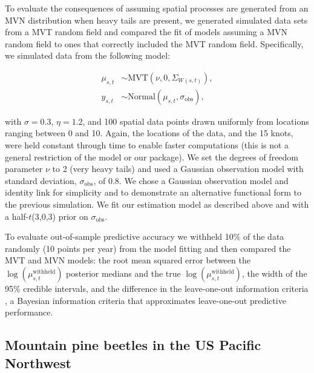 \documentclass[12pt,english]{article}
\begin{document}
\begin{spacing}{1.9}
To evaluate the consequences of assuming spatial processes are generated from an MVN
distribution when heavy tails are present, we generated simulated
data sets from a MVT random field and compared the fit of models assuming a
MVN random field to ones that correctly included the MVT random field. Specifically, we
simulated data from the following model:

\begin{align}
  \mu_{s,t} &\sim \mathrm{MVT}\left(\nu, 0, \Sigma_{W(s,t)}\right),\\
  y_{s,t} &\sim \mathrm{Normal} \left(\mu_{s,t}, \sigma_{\mathrm{obs}} \right),
\end{align}

\noindent with $\sigma = 0.3$, $\eta = 1.2$, and 100 spatial data points drawn uniformly
from locations ranging between 0 and 10. Again, the locations
of the data, and the 15 knots, were held constant through time to enable faster
computations (this is not a general restriction of the model or our package).
We set the degrees of freedom parameter $\nu$ to 2 (very heavy tails) and used a
Gaussian observation model with standard deviation, $\sigma_{\mathrm{obs}}$, of
0.8. We chose a Gaussian observation
model and identity link for simplicity and to demonstrate an alternative
functional form to the previous simulation. We fit our estimation model as
described above and with a half-$t$(3,0,3) prior on $\sigma_{\mathrm{obs}}$.

To evaluate out-of-sample predictive accuracy we withheld
10\% of the data randomly (10 points per year)
from the model fitting and then compared
the MVT and MVN models:
the root mean squared error
between the $\log(\mu^{\mathrm{withheld}}_{s,t})$
posterior medians and the true $\log\left(\mu^{\mathrm{withheld}}_{s,t}\right)$,
the width of the 95\% credible intervals,
and the difference in the leave-one-out information criteria
\citep[LOOIC;][]{vehtari2016},
a Bayesian information criteria that approximates
leave-one-out predictive performance.

\subsection{Mountain pine beetles in the US Pacific Northwest}


\end{spacing}
\end{document}
